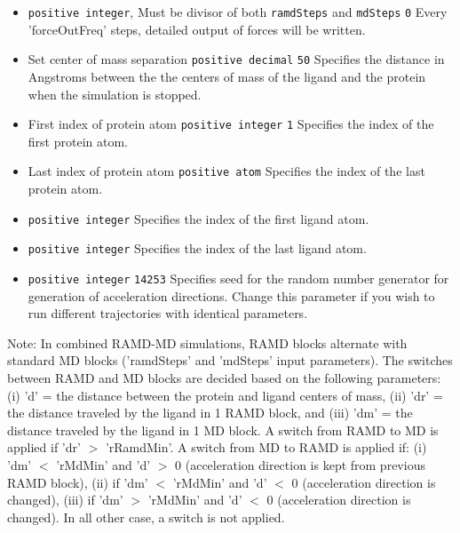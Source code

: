 \begin{itemize}
\item
{} {{\tt positive integer}, Must be divisor of both {\tt ramdSteps} and {\tt mdSteps}} {{\tt 0}} { Every 'forceOutFreq' steps, detailed output of forces will be written.} 

\item
{} {Set center of mass separation} {{\tt positive decimal}} {{\tt 50}} { Specifies the distance in Angstroms between the the centers of mass of the ligand and the protein when the simulation is stopped.}
 
\item
{} {First index of protein atom} {{\tt positive integer}} {{\tt 1}} { Specifies the index of the first protein atom.}
 
\item
{} {Last index of protein atom} {{\tt positive atom}} { Specifies the index of the last protein atom. } 

\item
{} {{\tt positive integer}} {Specifies the index of the first ligand atom.}

\item
{} {{\tt positive integer}} {Specifies the index of the last ligand atom. }

\item
{} {{\tt positive integer}} {{\tt 14253}} {Specifies seed for the random number generator for generation of acceleration directions. Change this parameter if you wish to run different trajectories with identical parameters.}

\end{itemize}

Note: 
In combined RAMD-MD simulations, RAMD blocks alternate with standard MD blocks ('ramdSteps' and 'mdSteps' input parameters). The switches between RAMD and MD blocks are decided based on the following parameters: (i) 'd' =  the distance between the protein and ligand centers of mass, (ii) 'dr' = the distance traveled by the ligand in 1 RAMD block, and (iii) 'dm' = the distance traveled by the ligand in 1 MD block. A switch from RAMD to MD is applied if 'dr' $>$ 'rRamdMin'. A switch from MD to RAMD is applied if: (i) 'dm' $<$ 'rMdMin' and 'd' $>$ 0 (acceleration direction is kept from previous RAMD block), (ii) if 'dm' $<$ 'rMdMin' and 'd' $<$ 0 (acceleration direction is changed), (iii) if 'dm' $>$ 'rMdMin' and 'd' $<$ 0 (acceleration direction is changed). In all other case, a switch is not applied.
 
